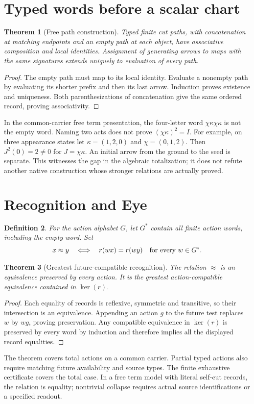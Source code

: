 \documentclass[11pt]{article}
\newtheorem{theorem}{Theorem}
\newtheorem{definition}[theorem]{Definition}
\begin{document}
\section{Typed words before a scalar chart}
\begin{theorem}[Free path construction]
Typed finite cut paths, with concatenation at matching endpoints and an
empty path at each object, have associative composition and local identities.
Assignment of generating arrows to maps with the same signatures extends
uniquely to evaluation of every path.
\end{theorem}
\begin{proof}
The empty path must map to its local identity. Evaluate a nonempty path by
evaluating its shorter prefix and then its last arrow. Induction proves
existence and uniqueness. Both parenthesizations of concatenation give the
same ordered record, proving associativity.
\end{proof}
In the common-carrier free term presentation, the four-letter word
$\chi\kappa\chi\kappa$ is not the empty word. Naming two acts does not
prove $(\chi\kappa)^2=I$. For example, on three appearance states let
$\kappa=(1,2,0)$ and $\chi=(0,1,2)$. Then $J^2(0)=2\ne0$ for
$J=\chi\kappa$. An initial arrow from the ground to the seed is separate.
This witnesses the gap in the algebraic totalization; it does not refute
another native construction whose stronger relations are actually proved.

\section{Recognition and Eye}
\begin{definition}
For the action alphabet $G$, let $G^*$ contain all finite action words,
including the empty word. Set
\[
x\approx y\quad\Longleftrightarrow\quad
r(wx)=r(wy)\quad\hbox{for every }w\in G^*.
\]
\end{definition}
\begin{theorem}[Greatest future-compatible recognition]
The relation $\approx$ is an equivalence preserved by every action. It is
the greatest action-compatible equivalence contained in $\ker(r)$.
\end{theorem}
\begin{proof}
Each equality of records is reflexive, symmetric and transitive, so their
intersection is an equivalence. Appending an action $g$ to the future test
replaces $w$ by $wg$, proving preservation. Any compatible equivalence in
$\ker(r)$ is preserved by every word by induction and therefore implies
all the displayed record equalities.
\end{proof}
The theorem covers total actions on a common carrier. Partial typed actions
also require matching future availability and source types. The finite
exhaustive certificate covers the total case. In a free term model with
literal self-cut records, the relation is equality; nontrivial collapse
requires actual source identifications or a specified readout.
\end{document}

